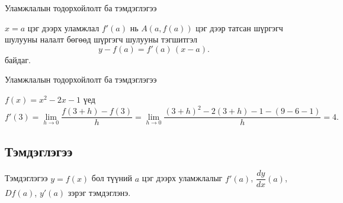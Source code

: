 \begin{frame}[allowframebreaks]{Уламжлалын тодорхойлолт ба тэмдэглэгээ}
\begin{note}
$x=a$ цэг дээрх уламжлал $f'(a)$ нь $A(a,f(a))$ цэг дээр татсан шүргэгч шулууны налалт бөгөөд шүргэгч шулууны тэгшитгэл
\[
y - f(a) = f'(a)\,(x-a).
\] байдаг.
\end{note}
\end{frame}

\begin{frame}[allowframebreaks]{Уламжлалын тодорхойлолт ба тэмдэглэгээ}
\begin{example}
$f(x)=x^2-2x-1$ үед
\[
f'(3)=\lim_{h\to 0}\frac{f(3+h)-f(3)}{h}
=\lim_{h\to 0}\frac{(3+h)^2-2(3+h)-1 - (9-6-1)}{h}=4.
\]
\end{example}

\begin{center}
\begin{fitbox}\end{fitbox}
\end{center}
\end{frame}

\subsection*{Тэмдэглэгээ}
\begin{frame}[allowframebreaks]{Тэмдэглэгээ}
$y=f(x)$ бол түүний $a$ цэг дээрх уламжлалыг $f'(a)$, $\dfrac{dy}{dx}(a)$, $Df(a)$, $y'(a)$ зэрэг тэмдэглэнэ.
\end{frame}

